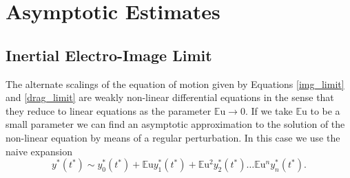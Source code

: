 \documentclass[12pt,a4paper,oneside]{book}
\begin{document}
\section{Asymptotic Estimates}
\subsection{Inertial Electro-Image Limit}
The alternate scalings of the equation of motion given by Equations \ref{img_limit} and \ref{drag_limit} are weakly non-linear differential equations in the sense that they reduce to linear equations as the parameter $\mathbb{E}\mbox{u} \rightarrow 0$. If we take $\mathbb{E}\mbox{u}$ to be a small parameter we can find an asymptotic approximation to the solution of the non-linear equation by means of a regular perturbation. In this case we use the naive expansion
\begin{equation}
{y^*}({t^*}) \sim y^*_0({t^*}) + \mathbb{E}\mbox{u} y^*_1({t^*}) + \mathbb{E}\mbox{u}^2 y^*_2({t^*}) \ldots \mathbb{E}\mbox{u}^n y^*_n ({t^*})  . \label{regular_pert}
\end{equation}
\end{document}
